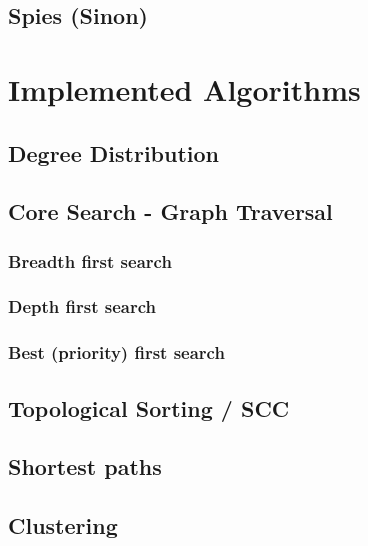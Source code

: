 	\subsection{Spies (Sinon)}
	\label{ssect:spies}


\section{Implemented Algorithms}
\label{sect:implemented_algos}

	\subsection{Degree Distribution}
	\label{ssect:deg_dist}

	\subsection{Core Search - Graph Traversal}
	\label{ssect:core_search}
	
		\subsubsection{Breadth first search}
		\label{sssect:search_bfs}
		
		\subsubsection{Depth first search}
		\label{sssect:search_dfs}
		
		\subsubsection{Best (priority) first search}
		\label{sssectsearch_:pfs}
		
	
	\subsection{Topological Sorting / SCC}
	\label{ssect:toposort_scc}
		
	\subsection{Shortest paths}
	\label{ssect:shortest_paths}
	
	\subsection{Clustering}
	\label{ssect:clustering}

